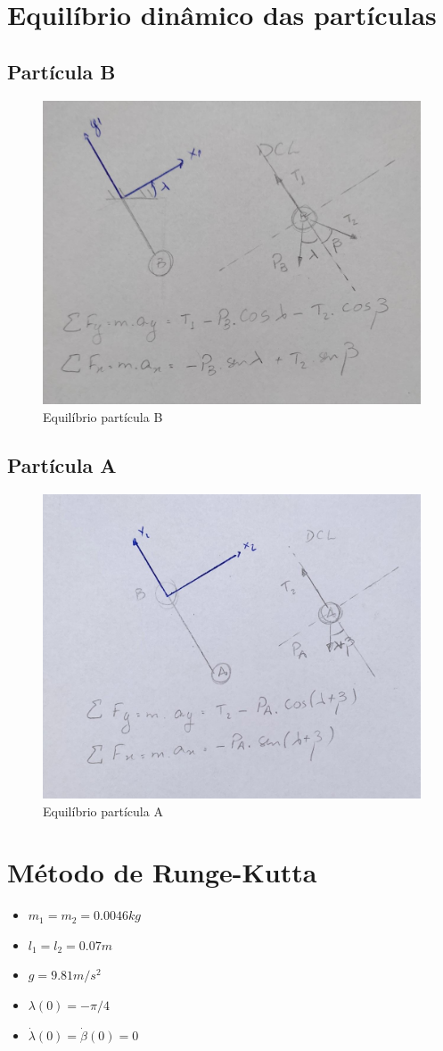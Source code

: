 \documentclass[a4paper, 12pt]{article}
\begin{document}
\newpage
\section{Equilíbrio dinâmico das partículas}
	\subsection{Partícula B}
		\begin{figure}[h]
			\centering
			\includegraphics[scale=0.2]{a.jpg}
			\caption{Equilíbrio partícula B}
		\end{figure}
	\subsection{Partícula A}
		\begin{figure}[h]
			\centering
			\includegraphics[scale=0.2]{b.jpg}
			\caption{Equilíbrio partícula A}
		\end{figure}

\newpage
\section{Método de Runge-Kutta}
	\begin{itemize}
		\item $m_1 = m_2 = 0.0046 kg$
		\item $l_1 = l_2 = 0.07m$
		\item $g = 9.81m/s^2$
		\item $\lambda(0) = -\pi/4$
		\item $\dot{\lambda}(0) = \dot{\beta}(0) = 0$
	\end{itemize}
\end{document}
